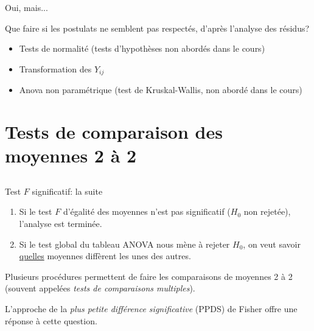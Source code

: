 \documentclass{BeamerTemplate}
\begin{document}
\begin{frame}[t]{Oui, mais...}

Que faire si les postulats ne semblent pas respectés, d'après l'analyse des résidus?

\medskip
\begin{itemize}\itemsep1.3cm
\item Tests de normalité (tests d'hypothèses non abordés dans le cours)
\item Transformation des $Y_{ij}$
\item Anova non paramétrique (test de Kruskal-Wallis, non abordé dans le cours)
\end{itemize}
\end{frame}


\section[Comparaisons 2 à 2]{Tests de comparaison des moyennes 2 à 2}\label{sec:ppds1fac}
\subsection*{ }

\begin{frame}[t]{Test $F$ significatif: la suite}

\begin{enumerate}
\item Si le test $F$ d'égalité des moyennes n'est pas significatif ($H_0$ non rejetée), l'analyse est terminée.
\vspace{.7cm}

\item Si le test global du tableau ANOVA nous mène à rejeter $H_0$, on veut savoir \underline{quelles} moyennes diff\`erent les unes des autres.
\vspace{.5cm}
\end{enumerate}

Plusieurs procédures permettent de faire les comparaisons de moyennes 2 \`a 2 (souvent appelées {\it tests de comparaisons multiples}).
\vspace{.5cm}

L'approche de la \alert{{\em plus petite différence significative} (PPDS)} de Fisher offre une réponse à cette question.
\end{frame}
\end{document}
